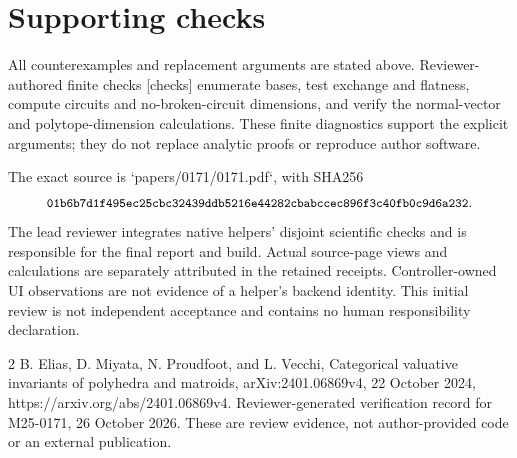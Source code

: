 \documentclass[10pt]{article}
\begin{document}
\section*{Supporting checks}
All counterexamples and replacement arguments are stated above. Reviewer-authored finite checks [checks] enumerate bases, test exchange and flatness, compute circuits and no-broken-circuit dimensions, and verify the normal-vector and polytope-dimension calculations. These finite diagnostics support the explicit arguments; they do not replace analytic proofs or reproduce author software.\par
The exact source is `papers/0171/0171.pdf`, with SHA256 \[\texttt{\small 01b6b7d1f495ec25cbc32439ddb5216e44282cbabccec896f3c40fb0c9d6a232}.\] The lead reviewer integrates native helpers’ disjoint scientific checks and is responsible for the final report and build. Actual source-page views and calculations are separately attributed in the retained receipts. Controller-owned UI observations are not evidence of a helper’s backend identity. This initial review is not independent acceptance and contains no human responsibility declaration.\par
2 B. Elias, D. Miyata, N. Proudfoot, and L. Vecchi, Categorical valuative invariants of polyhedra and matroids, arXiv:2401.06869v4, 22 October 2024, https://arxiv.org/abs/2401.06869v4. Reviewer-generated verification record for M25-0171, 26 October 2026. These are review evidence, not author-provided code or an external publication.\par
\end{document}
